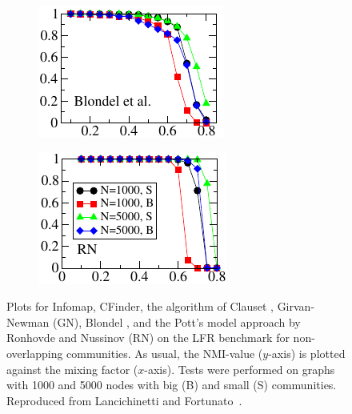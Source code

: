 \begin{figure}[h!]
\begin{subfigure}{0.35\textwidth}
    \end{subfigure}%
    \begin{subfigure}{0.35\textwidth}
    \centering
    \includegraphics[width=\otherplotswidth]{lfrpaper/5_split_kropped.pdf}
    \end{subfigure}%
    \begin{subfigure}{0.35\textwidth}
    \centering
    \includegraphics[width=\otherplotswidth]{lfrpaper/6_split_kropped.pdf}
    \end{subfigure}%
    \caption{
        Plots for Infomap, CFinder, the algorithm of Clauset \etal, Girvan-Newman (GN), Blondel \etal, 
        and the Pott's model approach by Ronhovde and Nussinov (RN) on the LFR benchmark for non-overlapping 
		communities. As usual, the NMI-value ($y$-axis) is plotted against the mixing factor ($x$-axis).
        Tests were performed on graphs with 1000 and 5000 nodes with big (B) and small (S) communities.
        Reproduced from Lancichinetti and Fortunato~\cite{LF09}.
    }\label{fig:main_Infomap_etal}
\end{figure}

